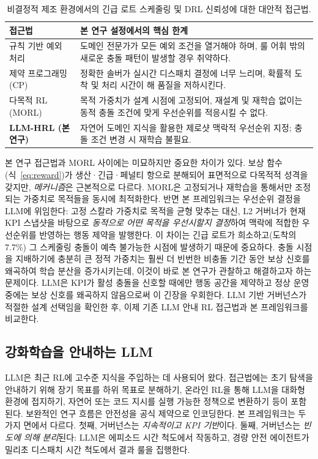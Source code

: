 \documentclass[10pt]{article}
\begin{document}
\begin{table}[thb]
\centering
\caption{비결정적 제조 환경에서의 긴급 로트 스케줄링 및 DRL 신뢰성에 대한
대안적 접근법.}
\label{tab:alternatives}
\setlength{\tabcolsep}{4pt}
\begin{tabularx}{\columnwidth}{@{}p{2.3cm}X@{}}
\hline
\textbf{접근법} & \textbf{본 연구 설정에서의 핵심 한계} \\ \hline
규칙 기반 예외 처리~\cite{waschneck2018}
  & 도메인 전문가가 모든 예외 조건을 열거해야 하며, 룰 어휘 밖의 새로운
    충돌 패턴이 발생할 경우 취약하다. \\[2pt]
제약 프로그래밍 (CP)~\cite{baptiste2001}
  & 정확한 솔버가 실시간 디스패치 결정에 너무 느리며, 확률적 도착 및 처리
    시간이 해 품질을 저하시킨다. \\[2pt]
다목적 RL (MORL)~\cite{hayes2022}
  & 목적 가중치가 설계 시점에 고정되어, 재설계 및 재학습 없이는 동적 충돌
    조건에 맞게 우선순위를 적응시킬 수 없다. \\[2pt]
\textbf{LLM-HRL (본 연구)}
  & 자연어 도메인 지식을 활용한 제로샷 맥락적 우선순위 지정; 충돌 조건 변경
    시 재학습 불필요. \\ \hline
\end{tabularx}
\end{table}

본 연구 접근법과 MORL 사이에는 미묘하지만 중요한 차이가 있다.
보상 함수(식~\ref{eq:reward})가 생산·긴급·페널티 항으로 분해되어 표면적으로
다목적적 성격을 갖지만, \emph{메커니즘}은 근본적으로 다르다.
MORL은 고정되거나 재학습을 통해서만 조정되는 가중치로 목적들을 동시에 최적화한다.
반면 본 프레임워크는 우선순위 결정을 LLM에 위임한다: 고정 스칼라 가중치로 목적을
균형 맞추는 대신, L2 거버너가 현재 KPI 스냅샷을 바탕으로 \emph{동적으로 어떤 목적을
우선시할지 결정}하여 맥락에 적합한 우선순위를 반영하는 행동 제약을 발행한다.
이 차이는 긴급 로트가 희소하고(도착의 7.7\%) 그 스케줄링 충돌이 예측 불가능한
시점에 발생하기 때문에 중요하다.
충돌 시점을 지배하기에 충분히 큰 정적 가중치는 훨씬 더 빈번한 비충돌 기간 동안
보상 신호를 왜곡하여 학습 분산을 증가시키는데, 이것이 바로 본 연구가 관찰하고
해결하고자 하는 문제이다.
LLM은 KPI가 활성 충돌을 신호할 때에만 행동 공간을 제약하고 정상 운영 중에는
보상 신호를 왜곡하지 않음으로써 이 긴장을 우회한다.
LLM 기반 거버넌스가 적절한 설계 선택임을 확인한 후, 이제 기존 LLM 안내 RL
접근법과 본 프레임워크를 비교한다.

\subsection{강화학습을 안내하는 LLM}
LLM은 최근 RL에 고수준 지식을 주입하는 데 사용되어 왔다. 접근법에는 초기 탐색을
안내하기 위해 장기 목표를 하위 목표로 분해하기\cite{du2023}, 온라인 RL을 통해
LLM을 대화형 환경에 접지하기\cite{carta2023}, 자연어 또는 코드 지시를 실행
가능한 정책으로 변환하기\cite{liang2023} 등이 포함된다. 보완적인 연구 흐름은
안전성을 공식 제약으로 인코딩한다\cite{hasanbeig2020}. 본 프레임워크는 두 가지
면에서 다르다. 첫째, 거버넌스는 \emph{지속적이고 KPI 기반}이다. 둘째, 거버넌스는
\emph{빈도에 의해 분리}된다: LLM은 에피소드 시간 척도에서 작동하고, 경량 안전
에이전트가 밀리초 디스패치 시간 척도에서 결과 룰을 집행한다.
\end{document}
